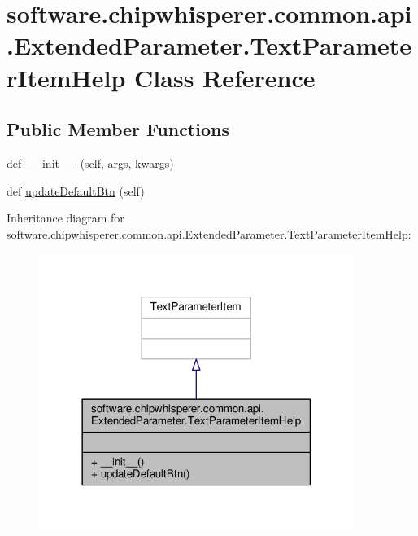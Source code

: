 \hypertarget{classsoftware_1_1chipwhisperer_1_1common_1_1api_1_1ExtendedParameter_1_1TextParameterItemHelp}{}\section{software.\+chipwhisperer.\+common.\+api.\+Extended\+Parameter.\+Text\+Parameter\+Item\+Help Class Reference}
\label{classsoftware_1_1chipwhisperer_1_1common_1_1api_1_1ExtendedParameter_1_1TextParameterItemHelp}
\subsection*{Public Member Functions}
\begin{DoxyCompactItemize}
\item 
def \hyperlink{classsoftware_1_1chipwhisperer_1_1common_1_1api_1_1ExtendedParameter_1_1TextParameterItemHelp_a85128cd4045010d3efaf9996fc9b2d31}{\+\_\+\+\_\+init\+\_\+\+\_\+} (self, args, kwargs)
\item 
def \hyperlink{classsoftware_1_1chipwhisperer_1_1common_1_1api_1_1ExtendedParameter_1_1TextParameterItemHelp_a323043aaab104c88c883748d576454b5}{update\+Default\+Btn} (self)
\end{DoxyCompactItemize}


Inheritance diagram for software.\+chipwhisperer.\+common.\+api.\+Extended\+Parameter.\+Text\+Parameter\+Item\+Help\+:\nopagebreak
\begin{figure}[H]
\begin{center}
\leavevmode
\includegraphics[width=290pt]{d3/d5b/classsoftware_1_1chipwhisperer_1_1common_1_1api_1_1ExtendedParameter_1_1TextParameterItemHelp__inherit__graph}
\end{center}
\end{figure}


